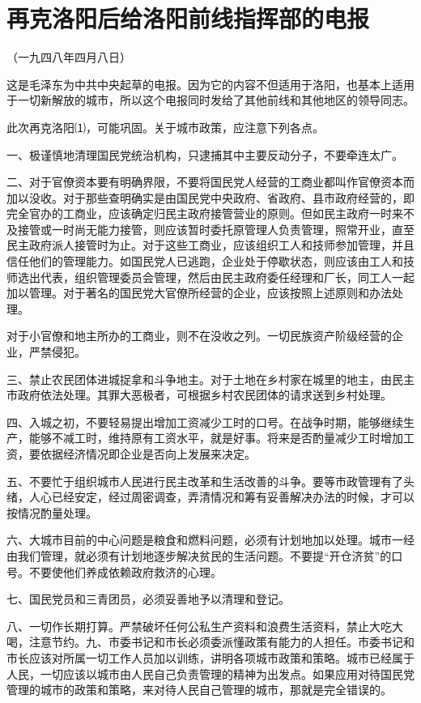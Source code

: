 \documentclass[UTF-8, a5paper, 12pt]{ctexart}
\begin{document}
\section{再克洛阳后给洛阳前线指挥部的电报}

（一九四八年四月八日）

这是毛泽东为中共中央起草的电报。因为它的内容不但适用于洛阳，也基本上适用于一切新解放的城市，所以这个电报同时发给了其他前线和其他地区的领导同志。

此次再克洛阳⑴，可能巩固。关于城市政策，应注意下列各点。

一、极谨慎地清理国民党统治机构，只逮捕其中主要反动分子，不要牵连太广。

二、对于官僚资本要有明确界限，不要将国民党人经营的工商业都叫作官僚资本而加以没收。对于那些查明确实是由国民党中央政府、省政府、县市政府经营的，即完全官办的工商业，应该确定归民主政府接管营业的原则。但如民主政府一时来不及接管或一时尚无能力接管，则应该暂时委托原管理人负责管理，照常开业，直至民主政府派人接管时为止。对于这些工商业，应该组织工人和技师参加管理，并且信任他们的管理能力。如国民党人已逃跑，企业处于停歇状态，则应该由工人和技师选出代表，组织管理委员会管理，然后由民主政府委任经理和厂长，同工人一起加以管理。对于著名的国民党大官僚所经营的企业，应该按照上述原则和办法处理。

对于小官僚和地主所办的工商业，则不在没收之列。一切民族资产阶级经营的企业，严禁侵犯。

三、禁止农民团体进城捉拿和斗争地主。对于土地在乡村家在城里的地主，由民主市政府依法处理。其罪大恶极者，可根据乡村农民团体的请求送到乡村处理。

四、入城之初，不要轻易提出增加工资减少工时的口号。在战争时期，能够继续生产，能够不减工时，维持原有工资水平，就是好事。将来是否酌量减少工时增加工资，要依据经济情况即企业是否向上发展来决定。

五、不要忙于组织城市人民进行民主改革和生活改善的斗争。要等市政管理有了头绪，人心已经安定，经过周密调查，弄清情况和筹有妥善解决办法的时候，才可以按情况酌量处理。

六、大城市目前的中心问题是粮食和燃料问题，必须有计划地加以处理。城市一经由我们管理，就必须有计划地逐步解决贫民的生活问题。不要提“开仓济贫”的口号。不要使他们养成依赖政府救济的心理。

七、国民党员和三青团员，必须妥善地予以清理和登记。

八、一切作长期打算。严禁破坏任何公私生产资料和浪费生活资料，禁止大吃大喝，注意节约。九、市委书记和市长必须委派懂政策有能力的人担任。市委书记和市长应该对所属一切工作人员加以训练，讲明各项城市政策和策略。城市已经属于人民，一切应该以城市由人民自己负责管理的精神为出发点。如果应用对待国民党管理的城市的政策和策略，来对待人民自己管理的城市，那就是完全错误的。
\end{document}
